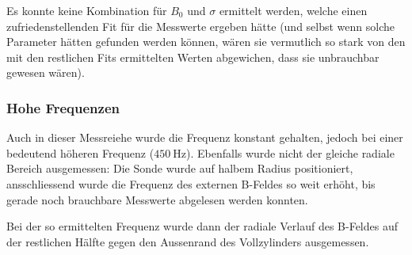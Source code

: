 {\begin{minipage}[t]{0.33\textwidth}
        Es konnte keine Kombination f\"ur $B_0$ und $\sigma$ ermittelt werden,
        welche  einen  zufriedenstellenden  Fit f\"ur  die  Messwerte  ergeben
        h\"atte  (und  selbst wenn  solche Parameter h\"atten  gefunden werden
        k\"onnen, w\"aren sie  vermutlich so stark von den  mit den restlichen
        Fits  ermittelten  Werten  abgewichen, dass  sie  unbrauchbar  gewesen
        w\"aren).
	\end{minipage}%
	\begin{minipage}[t]{0.67\textwidth}
        \vspace{0mm}
        \hfill
        \resizebox{.95\textwidth}{!}{}
        \label{fig:alu:rad:approx:low}
	\end{minipage}


    \subsubsection{Hohe Frequenzen}
    \label{sec:ausw:subsec:vollz:subsubsec:highfreq}

	\begin{minipage}[t]{0.33\textwidth}
        \vspace{0mm}
        Auch in dieser Messreiehe wurde die Frequenz konstant gehalten, jedoch
        bei einer bedeutend h\"oheren Frequenz ($\SI{450}{\hertz}$). Ebenfalls
        wurde nicht  der gleiche radiale Bereich  ausgemessen: Die Sonde wurde
        auf halbem Radius positioniert,  ansschliessend wurde die Frequenz des
        externen  B-Feldes  so  weit  erh\"oht,  bis  gerade  noch  brauchbare
        Messwerte abgelesen werden konnten.

        Bei  der  so  ermittelten  Frequenz wurde  dann  der  radiale  Verlauf
        des  B-Feldes auf  der restlichen  H\"alfte gegen  den Aussenrand  des
        Vollzylinders ausgemessen.


\end{minipage}}
